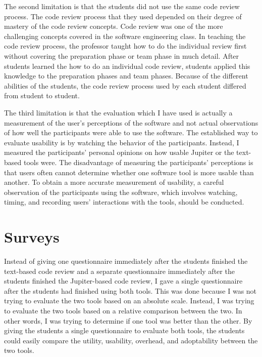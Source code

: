 The second limitation is that the students did not use the same code review process. The code review process that they used depended on their degree of mastery of the code review concepts. Code review was one of the more challenging concepts covered in the software engineering class. In teaching the code review process, the professor taught how to do the individual review first without covering the preparation phase or team phase in much detail. After students learned the how to do an individual code review, students applied this knowledge to the preparation phases and team phases. Because of the different abilities of the students, the code review process used by each student differed from student to student.

The third limitation is that the evaluation which I have used is actually a measurement of the user's perceptions of the software and not actual observations of how well the participants were able to use the software. The established way to evaluate usability is by watching the behavior of the participants. Instead, I measured the participants' personal opinions on how usable Jupiter or the text-based tools were. The disadvantage of measuring the participants' perceptions is that users often cannot determine whether one software tool is more usable than another. To obtain a more accurate measurement of usability, a careful observation of the participants using the software, which involves watching, timing, and recording users' interactions with the tools, should be conducted.

\section{Surveys}
\label{sec:surveys}

Instead of giving one questionnaire immediately after the students finished the text-based code review and a separate questionnaire immediately after the students finished the Jupiter-based code review, I gave a single questionnaire after the students had finished using both tools. This was done because I was not trying to evaluate the two tools based on an absolute scale. Instead, I was trying to evaluate the two tools based on a relative comparison between the two. In other words, I was trying to determine if one tool was better than the other. By giving the students a single questionnaire to evaluate both tools, the students could easily compare the utility, usability, overhead, and adoptability between the two tools.

